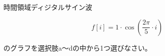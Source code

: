時間領域ディジタルサイン波 

\[
f[i] = 1 \cdot \cos \left ( \frac{2 \pi}{5} \cdot i  \right )
\]

\noindent のグラフを選択肢a〜dの中から1つ選びなさい。

